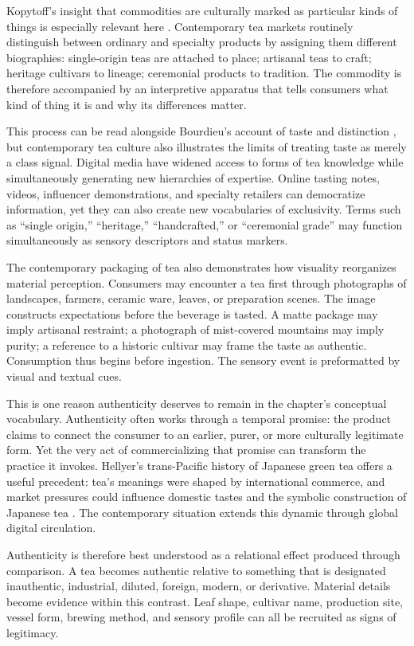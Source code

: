 \documentclass[numbers]{IntechOpen-Book}
\begin{document}
Kopytoff's insight that commodities are culturally marked as particular kinds of things is especially relevant here \cite{kopytoff1986}. Contemporary tea markets routinely distinguish between ordinary and specialty products by assigning them different biographies: single-origin teas are attached to place; artisanal teas to craft; heritage cultivars to lineage; ceremonial products to tradition. The commodity is therefore accompanied by an interpretive apparatus that tells consumers what kind of thing it is and why its differences matter.

This process can be read alongside Bourdieu's account of taste and distinction \cite{bourdieu1984}, but contemporary tea culture also illustrates the limits of treating taste as merely a class signal. Digital media have widened access to forms of tea knowledge while simultaneously generating new hierarchies of expertise. Online tasting notes, videos, influencer demonstrations, and specialty retailers can democratize information, yet they can also create new vocabularies of exclusivity. Terms such as ``single origin,'' ``heritage,'' ``handcrafted,'' or ``ceremonial grade'' may function simultaneously as sensory descriptors and status markers.

The contemporary packaging of tea also demonstrates how visuality reorganizes material perception. Consumers may encounter a tea first through photographs of landscapes, farmers, ceramic ware, leaves, or preparation scenes. The image constructs expectations before the beverage is tasted. A matte package may imply artisanal restraint; a photograph of mist-covered mountains may imply purity; a reference to a historic cultivar may frame the taste as authentic. Consumption thus begins before ingestion. The sensory event is preformatted by visual and textual cues.

This is one reason authenticity deserves to remain in the chapter's conceptual vocabulary. Authenticity often works through a temporal promise: the product claims to connect the consumer to an earlier, purer, or more culturally legitimate form. Yet the very act of commercializing that promise can transform the practice it invokes. Hellyer's trans-Pacific history of Japanese green tea offers a useful precedent: tea's meanings were shaped by international commerce, and market pressures could influence domestic tastes and the symbolic construction of Japanese tea \cite{hellyer2021}. The contemporary situation extends this dynamic through global digital circulation.

Authenticity is therefore best understood as a relational effect produced through comparison. A tea becomes authentic relative to something that is designated inauthentic, industrial, diluted, foreign, modern, or derivative. Material details become evidence within this contrast. Leaf shape, cultivar name, production site, vessel form, brewing method, and sensory profile can all be recruited as signs of legitimacy.
\end{document}
